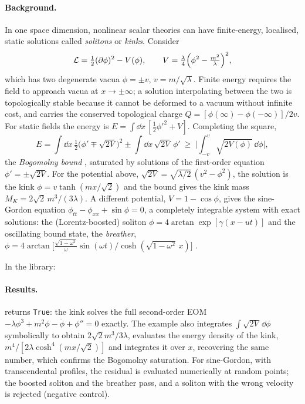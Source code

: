 \paragraph{Background.} In one space dimension, nonlinear scalar theories can have finite-energy, localised, static solutions called \emph{solitons} or \emph{kinks}. Consider
\begin{equation}
\mathcal L=\tfrac12(\partial\phi)^2-V(\phi),\qquad V=\tfrac\lambda4\Big(\phi^2-\tfrac{m^2}{\lambda}\Big)^2,
\end{equation}
which has two degenerate vacua $\phi=\pm v$, $v=m/\sqrt\lambda$. Finite energy requires the field to approach vacua at $x\to\pm\infty$; a solution interpolating between the two is topologically stable because it cannot be deformed to a vacuum without infinite cost, and carries the conserved topological charge $Q=[\phi(\infty)-\phi(-\infty)]/2v$. For static fields the energy is $E=\int\dd x\,[\tfrac12\phi'^2+V]$. Completing the square,
\begin{equation}
E=\int\dd x\,\tfrac12\big(\phi'\mp\sqrt{2V}\big)^2\pm\int\dd x\,\sqrt{2V}\,\phi'\ \ge\ \Big|\int_{-v}^{v}\sqrt{2V(\phi)}\,\dd\phi\Big|,
\label{eq:bogomolny1d}
\end{equation}
the \emph{Bogomolny bound} \cite{Bogomolny1976}, saturated by solutions of the first-order equation $\phi'=\pm\sqrt{2V}$. For the potential above, $\sqrt{2V}=\sqrt{\lambda/2}\,(v^2-\phi^2)$, the solution is the kink $\phi=v\tanh(mx/\sqrt2)$ and the bound gives the kink mass $M_K=2\sqrt2\,m^3/(3\lambda)$. A different potential, $V=1-\cos\phi$, gives the sine-Gordon equation $\phi_{tt}-\phi_{xx}+\sin\phi=0$, a completely integrable system with exact solutions: the (Lorentz-boosted) soliton $\phi=4\arctan\exp[\gamma(x-ut)]$ and the oscillating bound state, the \emph{breather}, $\phi=4\arctan\!\big[\tfrac{\sqrt{1-\omega^2}}{\omega}\sin(\omega t)/\cosh(\sqrt{1-\omega^2}\,x)\big]$ \cite{Rajaraman}.

In the library:


\paragraph{Results.}  returns \texttt{True}: the kink solves the full second-order EOM $-\lambda\phi^3+m^2\phi-\ddot\phi+\phi''=0$ exactly. The example also integrates $\int\sqrt{2V}\,\dd\phi$ symbolically to obtain $2\sqrt2m^3/3\lambda$, evaluates the energy density of the kink, $m^4/[2\lambda\cosh^4(mx/\sqrt2)]$ and integrates it over $x$, recovering the same number, which confirms the Bogomolny saturation. For sine-Gordon, with transcendental profiles, the residual is evaluated numerically at random points; the boosted soliton and the breather pass, and a soliton with the wrong velocity is rejected (negative control).

